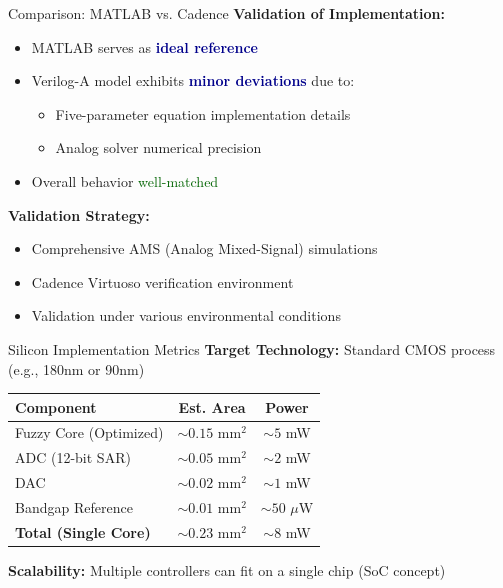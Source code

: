 \documentclass[aspectratio=169,usenames,dvipsnames]{beamer}
\newcommand{\highlight}[1]{\textcolor{darkblue}{\textbf{#1}}}
\begin{document}
\begin{frame}{Comparison: MATLAB vs. Cadence}
    \textbf{Validation of Implementation:}
    
    \vspace{0.3cm}
    \begin{itemize}
        \item MATLAB serves as \highlight{ideal reference}
        \item Verilog-A model exhibits \highlight{minor deviations} due to:
            \begin{itemize}
                \item Five-parameter equation implementation details
                \item Analog solver numerical precision
            \end{itemize}
        \item Overall behavior \textcolor{darkgreen}{well-matched}
    \end{itemize}
    
    \vspace{0.3cm}
    \textbf{Validation Strategy:}
    \begin{itemize}
        \item Comprehensive AMS (Analog Mixed-Signal) simulations
        \item Cadence Virtuoso verification environment
        \item Validation under various environmental conditions
    \end{itemize}
\end{frame}

\begin{frame}{Silicon Implementation Metrics}
    \textbf{Target Technology:} Standard CMOS process (e.g., 180nm or 90nm)
    
    \vspace{0.3cm}
    \begin{table}
        \centering
        \small
        \begin{tabular}{|l|c|c|}
            \hline
            \textbf{Component} & \textbf{Est. Area} & \textbf{Power} \\
            \hline
            Fuzzy Core (Optimized) & $\sim 0.15$ mm$^2$ & $\sim 5$ mW \\
            \hline
            ADC (12-bit SAR) & $\sim 0.05$ mm$^2$ & $\sim 2$ mW \\
            \hline
            DAC & $\sim 0.02$ mm$^2$ & $\sim 1$ mW \\
            \hline
            Bandgap Reference & $\sim 0.01$ mm$^2$ & $\sim 50$ $\mu$W \\
            \hline
            \textbf{Total (Single Core)} & $\sim 0.23$ mm$^2$ & $\sim 8$ mW \\
            \hline
        \end{tabular}
    \end{table}
    
    \vspace{0.2cm}
    \textbf{Scalability:} Multiple controllers can fit on a single chip (SoC concept)
\end{frame}
\end{document}
